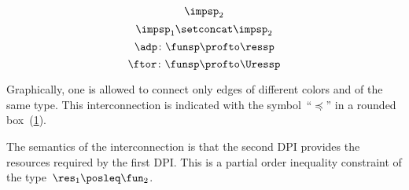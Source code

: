 {\begin{forslides}
\begin{equation}
            \impsp_2
        \end{equation}
        \begin{equation}
            \label{eq:impsp12}
            \impsp_{1} \setconcat \impsp_{2}
        \end{equation}
        \begin{equation}
            \label{eq:dproba}
            \adp \colon \funsp \profto \ressp
        \end{equation}
        \begin{equation}
            \label{eq:dprob2}
            \ftor \colon \funsp \profto \Uressp
        \end{equation}
    \end{forslides}
}

Graphically, one is allowed to connect only edges of different colors and of the same type.
This interconnection is indicated with the symbol~``$\preceq$'' in a rounded box~(\cref{fig:connection}).

\begin{figure}[h]
    \centering
    \caption{}
    \label{fig:connection}
\end{figure}


The semantics of the interconnection is that the second DPI provides the resources required by the first DPI.
This is a partial order inequality constraint of the type~$\res_{1}\posleq\fun_{2}$.

